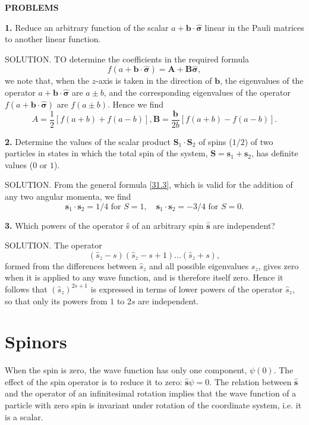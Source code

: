 {\small
\textbf{PROBLEMS}


\textbf{1.} Reduce an arbitrary function of the scalar $ a + \bm{b}\cdot\hat{\bm{\sigma}} $ linear in the Pauli matrices to another linear function.





SOLUTION. TO determine the coefficients in the required formula
\[  f (a + \bm{b}\cdot\hat{\bm{\sigma}}) = \bm{A}+\bm{B}\hat{\bm{\sigma}},  \]
we note that, when the $ z $-axis is taken in the direction of $ \bm{b} $, the eigenvalues of the operator $ a + \bm{b}\cdot\hat{\bm{\sigma}} $ are $ a \pm b $, and the corresponding eigenvalues of the operator $ f (a + \bm{b}\cdot\hat{\bm{\sigma}})  $ are $ f (a \pm b) $. Hence we find 
\[ A = \frac{1}{2}[f (a + b) + f (a − b)], \bm{B} = \frac{\bm{b}}{2b} [f (a + b)-f (a−b)]. \]





\textbf{2.} Determine the values of the scalar product $ \bm{S}_1\cdot\bm{S}_2 $ of spins ($ 1/2 $) of two particles in states in which the total spin of the system, $ \bm{S} = \bm{s}_1 + \bm{s}_2 $, has definite values ($ 0 $ or $ 1 $).





SOLUTION. From the general formula \eqref{31.3}, which is valid for the addition of any two angular momenta, we find 
\[ \bm{s}_1\cdot \bm{s}_2 = 1/4\text{ for }S = 1,\quad \bm{s}_1\cdot \bm{s}_2 = -3/4\text{ for }S = 0. \]





\textbf{3.} Which powers of the operator ŝ of an arbitrary spin $\hat{\bm{s}}$ are independent?





SOLUTION. The operator
\[ (\hat{s}_z-s)(\hat{s}_z-s+1)\dots(\hat{s}_z+s), \]
formed from the differences between $\hat{s}_z$ and all possible eigenvalues $ s_z $, gives zero when it is applied to any wave function, and is therefore itself zero. Hence it follows that $ (\hat{s}_z)^{2s+1} $ is expressed in terms of lower powers of the operator $\hat{s}_z$, so that only its powers from $ 1 $ to $ 2s $ are independent.}
\section{Spinors}\label{Spinors}
When the spin is zero, the wave function has only one component, $ \psi(0) $. The effect of the spin operator is to reduce it to zero: $ \hat{\bm{s}}\psi= 0 $. The relation between $ \hat{\bm{s}} $ and the operator of an infinitesimal rotation implies that the wave function of a particle with zero spin is invariant under rotation of the coordinate system, i.e. it is a scalar.

